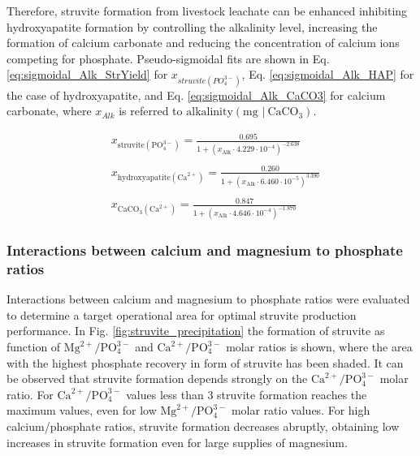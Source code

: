 \begin{refsection}[referencesCh3]
Therefore, struvite formation from livestock leachate can be enhanced inhibiting hydroxyapatite formation by controlling the alkalinity level, increasing the formation of calcium carbonate and reducing the concentration of calcium ions competing for phosphate. 
Pseudo-sigmoidal fits are shown in Eq. \ref{eq:sigmoidal_Alk_StrYield} for $x_{struvite \left(PO_{4}^{3-}\right)}$, Eq. \ref{eq:sigmoidal_Alk_HAP} for the case of hydroxyapatite, and Eq. \ref{eq:sigmoidal_Alk_CaCO3} for calcium carbonate, where $ x_{Alk}$ is referred to $\text{alkalinity} \left( \text{mg } | \ \text{CaCO}_{3}\right)$.

\begin{align}
& x_{\text{struvite} \left(\text{PO}_{4}^{3-}\right)} = \frac{0.695}{1+\left(x_{\text{Alk}} \cdot 4.229 \cdot 10^{-4}\right)^{-2.638}} \label{eq:sigmoidal_Alk_StrYield} \\
\nonumber \\
& x_{\text{hydroxyapatite} \left(\text{Ca}^{2+}\right)} = \frac{0.260}{1+\left(x_{\text{Alk}} \cdot 6.460 \cdot 10^{-5}\right)^{3.390}} \label{eq:sigmoidal_Alk_HAP} \\
\nonumber \\
& x_{\text{CaCO}_{3} \left(\text{Ca}^{2+}\right)} = \frac{0.847}{1+\left(x_{\text{Alk}} \cdot 4.646 \cdot 10^{-4}\right)^{-1.870}} \label{eq:sigmoidal_Alk_CaCO3}
\end{align}

\subsubsection{Interactions between calcium and magnesium to phosphate ratios}
Interactions between calcium and magnesium to phosphate ratios were evaluated to determine a target operational area for optimal struvite production performance. In Fig. \ref{fig:struvite_precipitation} the formation of struvite as function of $\text{Mg}^{2+}/\text{PO}_{4}^{3-}$ and $\text{Ca}^{2+}/\text{PO}_{4}^{3-}$ molar ratios is shown, where the area with the highest phosphate recovery in form of struvite has been shaded. It can be observed that struvite formation depends strongly on the $\text{Ca}^{2+}/\text{PO}_{4}^{3-}$ molar ratio. For $\text{Ca}^{2+}/\text{PO}_{4}^{3-}$ values less than 3 struvite formation reaches the maximum values, even for low $\text{Mg}^{2+}/\text{PO}_{4}^{3-}$ molar ratio values. For high calcium/phosphate ratios, struvite formation decreases abruptly, obtaining low increases in struvite formation even for large supplies of magnesium.


\end{refsection}
